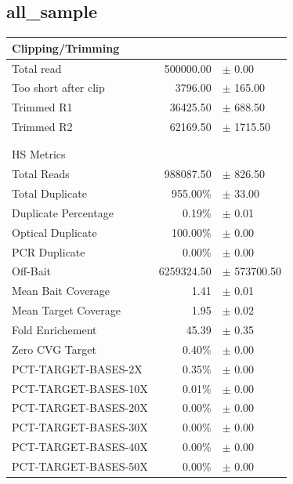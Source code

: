 \documentclass[10pt,twoside,english]{scrartcl}
\begin{document}
\begin{landscape} 
\subsection{all\_sample} 
\begin{minipage}[c][6in]{9.3in} 
\centering 
\begin{minipage}[c][6in]{4in}
\centering
\begin{tabular}{lrl}
\multicolumn{3}{l}{Clipping/Trimming} \\ 

\hline 
Total read              & 500000.00& $\pm$ 0.00  \\ 
Too short after clip    & 3796.00 & $\pm$ 165.00\\ 
Trimmed R1              & 36425.50 & $\pm$ 688.50\\ 
Trimmed R2              & 62169.50 & $\pm$ 1715.50 \\ 
\hline 
\\\\ 
\multicolumn{3}{l}{HS Metrics} \\ 
\hline 
Total Reads             & 988087.50 & $\pm$ 826.50\\ 
Total Duplicate         & 955.00\%  & $\pm$ 33.00\\ 
Duplicate Percentage    & 0.19\%  & $\pm$ 0.01 \\ 
Optical Duplicate       & 100.00\%  & $\pm$ 0.00 \\ 
PCR Duplicate           & 0.00\%  & $\pm$ 0.00 \\ 
Off-Bait                & 6259324.50  & $\pm$ 573700.50 \\ 
Mean Bait Coverage      & 1.41  & $\pm$ 0.01 \\ 
Mean Target Coverage    & 1.95  & $\pm$ 0.02 \\ 
Fold Enrichement        & 45.39  & $\pm$ 0.35 \\ 
Zero CVG Target         & 0.40\%  & $\pm$ 0.00 \\ 
PCT-TARGET-BASES-2X     & 0.35\%  & $\pm$ 0.00 \\ 
PCT-TARGET-BASES-10X    & 0.01\%  & $\pm$ 0.00 \\ 
PCT-TARGET-BASES-20X    & 0.00\%  & $\pm$  0.00\\ 
PCT-TARGET-BASES-30X    & 0.00\%  & $\pm$ 0.00 \\ 
PCT-TARGET-BASES-40X    & 0.00\%  & $\pm$ 0.00 \\ 
PCT-TARGET-BASES-50X    & 0.00\%  & $\pm$ 0.00 \\ 

\end{tabular}
\end{minipage}
\end{minipage}
\end{landscape}
\end{document}
